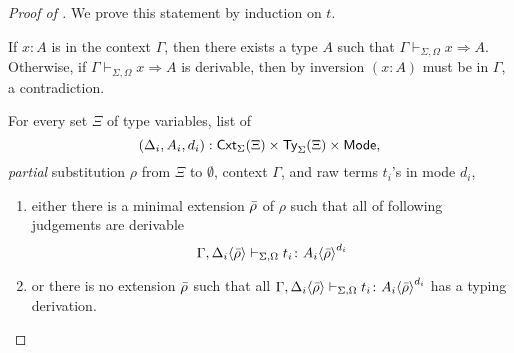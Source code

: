 \begin{proof}[Proof of {}]
  We prove this statement by induction on $t$.

  \begin{description}
    \item[(var)] If $x : A$ is in the context $\Gamma$, then there exists a type $A$ such that $\Gamma \vdash_{\Sigma, \Omega} x \Rightarrow A$.
      Otherwise, if $\Gamma \vdash_{\Sigma, \Omega} x \Rightarrow A$ is derivable, then by inversion $(x : A)$ must be in $\Gamma$, a contradiction.
    \item[(anno)]
    \item[(sub)]
    \item For every set $\Xi$ of type variables, list of
      \[
        \left(\Delta_i, A_i, d_i\right) : \mathsf{Cxt}_{\Sigma}(\Xi) \times \mathsf{Ty}_{\Sigma}(\Xi) \times \mathsf{Mode}, 
      \]
      \emph{partial} substitution $\rho$ from $\Xi$ to $\emptyset$, context $\Gamma$, and raw terms $t_i$'s in mode $d_i$,
      \begin{enumerate}
        \item either there is a minimal extension $\bar{\rho}$ of $\rho$ such that all     of following judgements are derivable
          \[
            \Gamma, {\Delta_i}\!\left<{\bar{\rho}}\right> \vdash_{\Sigma, \Omega} t_i \colon {A_i}\!\left<{\bar{\rho}}\right>^{d_i}
          \]

        \item or there is no extension $\bar{\rho}$ such that all $\Gamma, {\Delta_i}\!\left<{\bar{\rho}}\right> \vdash_{\Sigma, \Omega} t_i \colon {A_i}\!\left<{\bar{\rho}}\right>^{d_i}$ has a typing derivation. 
      \end{enumerate}
  \end{description}
\end{proof}
